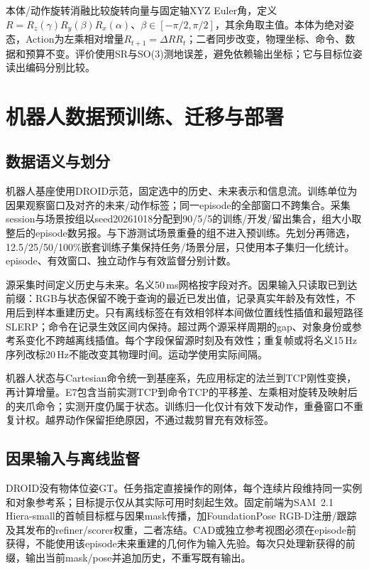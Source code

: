 本体/动作旋转消融比较旋转向量与固定轴XYZ Euler角，定义$R=R_z(\gamma)R_y(\beta)R_x(\alpha)$、$\beta\in[-\pi/2,\pi/2]$，其余角取主值。本体为绝对姿态，Action为左乘相对增量$R_{t+1}=\Delta R R_t$；二者同步改变，物理坐标、命令、数据和预算不变。评价使用SR与SO(3)测地误差，避免依赖输出坐标；它与目标位姿读出编码分别比较。

\section{机器人数据预训练、迁移与部署}
\label{app:systems}
\subsection{数据语义与划分}
机器人基座使用DROID示范\cite{droid}，固定选中的历史、未来表示和信息流。训练单位为因果观察窗口及对齐的未来/动作标签；同一episode的全部窗口不跨集合。采集session与场景按组以seed20261018分配到90/5/5的训练/开发/留出集合，组大小取整后的episode数另报。与下游测试场景重叠的组不进入预训练。先划分再筛选，12.5/25/50/100\%嵌套训练子集保持任务/场景分层，只使用本子集归一化统计。episode、有效窗口、独立动作与有效监督分别计数。

源采集时间定义历史与未来。名义50\,ms网格按字段对齐。因果输入只读取已到达前缀：RGB与状态保留不晚于查询的最近已发出值，记录真实年龄及有效性，不用后到样本重建历史。只有离线标签在有效相邻样本间做位置线性插值和最短路径SLERP；命令在记录生效区间内保持。超过两个源采样周期的gap、对象身份或参考系变化不跨越离线插值。每个字段保留源时刻及有效性；重复帧或将名义15\,Hz序列改标20\,Hz不能改变其物理时间。运动学使用实际间隔。

机器人状态与Cartesian命令统一到基座系，先应用标定的法兰到TCP刚性变换，再计算增量。E7包含当前实测TCP到命令TCP的平移差、左乘相对旋转及映射后的夹爪命令；实测开度仍属于状态。训练归一化仅计有效下发动作，重叠窗口不重复计权。越界动作保留拒绝原因，不通过裁剪冒充有效标签。

\subsection{因果输入与离线监督}
DROID没有物体位姿GT。任务指定直接操作的刚体，每个连续片段维持同一实例和对象参考系；目标提示仅从其实际可用时刻起生效。固定前端为SAM~2.1 Hiera-small的首帧目标框与因果mask传播，加FoundationPose RGB-D注册/跟踪及其发布的refiner/scorer权重\cite{sam2,foundationpose}，二者冻结。CAD或独立参考视图必须在episode前获得，不能使用该episode未来重建的几何作为输入先验。每次只处理新获得的前缀，输出当前mask/pose并追加历史，不重写既有输出。

